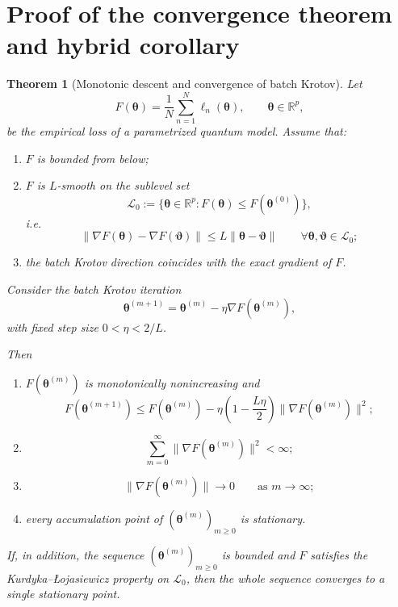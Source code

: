 \documentclass[aps,prb,10pt,twocolumn,superscriptaddress]{revtex4-2}
\newtheorem{theorem}{Theorem}
\begin{document}
\section{Proof of the convergence theorem and hybrid corollary}

\begin{theorem}[Monotonic descent and convergence of batch Krotov]
\label{thm:batch_krotov_convergence_appendix}
Let
\[
F(\bm{\theta})=\frac{1}{N}\sum_{n=1}^N \ell_n(\bm{\theta}), \qquad \bm{\theta}\in\mathbb{R}^p,
\]
be the empirical loss of a parametrized quantum model. Assume that:
\begin{enumerate}
    \item \(F\) is bounded from below;
    \item \(F\) is \(L\)-smooth on the sublevel set
    \[
    \mathcal{L}_0:=\{\bm{\theta}\in\mathbb{R}^p : F(\bm{\theta})\leq F(\bm{\theta}^{(0)})\},
    \]
    i.e.
    \[
    \|\nabla F(\bm{\theta})-\nabla F(\bm{\vartheta})\|
    \leq
    L\|\bm{\theta}-\bm{\vartheta}\|
    \qquad
    \forall \bm{\theta},\bm{\vartheta}\in\mathcal{L}_0;
    \]
    \item the batch Krotov direction coincides with the exact gradient of \(F\).
\end{enumerate}

Consider the batch Krotov iteration
\[
\bm{\theta}^{(m+1)}
=
\bm{\theta}^{(m)}-\eta \nabla F(\bm{\theta}^{(m)}),
\]
with fixed step size \(0<\eta<2/L\).

Then
\begin{enumerate}
    \item[\rm(i)] \(F(\bm{\theta}^{(m)})\) is monotonically nonincreasing and
    \[
    F(\bm{\theta}^{(m+1)})
    \leq
    F(\bm{\theta}^{(m)})
    -
    \eta\left(1-\frac{L\eta}{2}\right)\|\nabla F(\bm{\theta}^{(m)})\|^2;
    \]
    \item[\rm(ii)]
    \[
    \sum_{m=0}^{\infty}\|\nabla F(\bm{\theta}^{(m)})\|^2<\infty;
    \]
    \item[\rm(iii)]
    \[
    \|\nabla F(\bm{\theta}^{(m)})\|\to 0
    \qquad \text{as } m\to\infty;
    \]
    \item[\rm(iv)] every accumulation point of \((\bm{\theta}^{(m)})_{m\geq 0}\) is stationary.
\end{enumerate}
If, in addition, the sequence \((\bm{\theta}^{(m)})_{m\geq 0}\) is bounded and \(F\) satisfies the Kurdyka--\L{}ojasiewicz property on \(\mathcal{L}_0\), then the whole sequence converges to a single stationary point.
\end{theorem}
\end{document}
